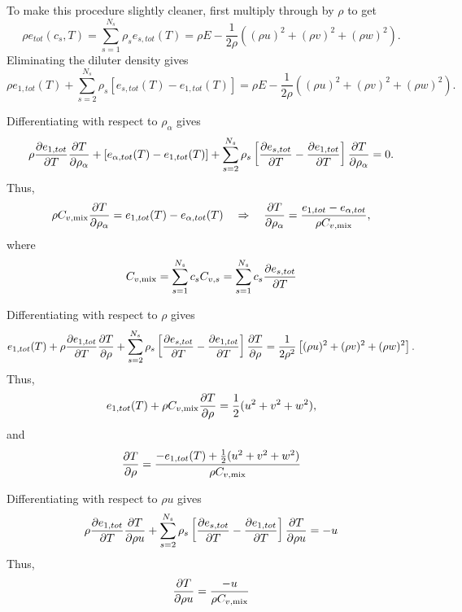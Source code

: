 To make this procedure slightly cleaner, first multiply through by
$\rho$ to get
%
\begin{equation*}
\rho e_{tot}(c_s, T) = \sum_{s=1}^{N_s} \rho_s e_{s,tot}(T) = \rho E - \frac{1}{2 \rho } \left( (\rho u)^2 + (\rho v)^2 + (\rho w)^2 \right).
\end{equation*}
%
Eliminating the diluter density gives
%
\begin{equation*}
\rho e_{1,tot}(T) + \sum_{s=2}^{N_s} \rho_s \left[ e_{s,tot}(T) - e_{1,tot}(T) \right] = \rho E - \frac{1}{2 \rho } \left( (\rho u)^2 + (\rho v)^2 + (\rho w)^2 \right).
\end{equation*}
%

Differentiating with respect to $\rho_{\alpha}$ gives
%
\begin{equation*}
\rho \frac{\partial e_{1,tot}}{\partial T} \frac{\partial T}{\partial \rho_{\alpha}} + \left[ e_{\alpha, tot}(T) - e_{1,tot}(T) \right] + \sum_{s=2}^{N_s} \rho_s \left[ \frac{\partial e_{s,tot}}{\partial T} - \frac{\partial e_{1,tot}}{\partial T} \right] \frac{\partial T}{\partial \rho_{\alpha}} = 0.
\end{equation*}
%
Thus,
%
\begin{equation*}
\rho C_{v,\text{mix}} \frac{\partial T}{\partial \rho_{\alpha}} = e_{1,tot}(T) - e_{\alpha,tot}(T) \quad \Rightarrow \quad \frac{\partial T}{\partial \rho_{\alpha}} = \frac{e_{1,tot} - e_{\alpha,tot}}{ \rho C_{v,\text{mix}}},
\end{equation*}
%
where
%
\begin{equation*}
C_{v,\text{mix}} = \sum_{s=1}^{N_s} c_s C_{v,s} = \sum_{s=1}^{N_s} c_s \frac{\partial e_{s,tot}}{\partial T}
\end{equation*}
%

Differentiating with respect to $\rho$ gives
%
\begin{equation*}
e_{1,tot}(T) + \rho \frac{\partial e_{1,tot}}{\partial T} \frac{\partial T}{\partial \rho} + \sum_{s=2}^{N_s} \rho_s \left[ \frac{\partial e_{s,tot}}{\partial T} - \frac{\partial e_{1,tot}}{\partial T} \right] \frac{\partial T}{\partial \rho} = \frac{1}{2 \rho^2} \left[ (\rho u)^2 + (\rho v)^2 + (\rho w)^2 \right].
\end{equation*}
%
Thus,
%
\begin{equation*}
e_{1,tot}(T) + \rho C_{v,\text{mix}} \frac{\partial T}{\partial \rho} = \frac{1}{2} (u^2 + v^2 + w^2),
\end{equation*}
%
and
%
\begin{equation*}
\frac{\partial T}{\partial \rho} = \frac{ -e_{1,tot}(T) + \frac{1}{2} (u^2 + v^2 + w^2) }{\rho C_{v,\text{mix}} }
\end{equation*}
%

Differentiating with respect to $\rho u$ gives
%
\begin{equation*}
\rho \frac{\partial e_{1,tot}}{\partial T} \frac{\partial T}{\partial \rho u} + \sum_{s=2}^{N_s} \rho_s \left[ \frac{\partial e_{s,tot}}{\partial T} - \frac{\partial e_{1,tot}}{\partial T} \right] \frac{\partial T}{\partial \rho u} = -u
\end{equation*}
%
Thus,
%
\begin{equation*}
\frac{\partial T}{\partial \rho u} = \frac{-u}{\rho C_{v,\text{mix}}}
\end{equation*}
%

